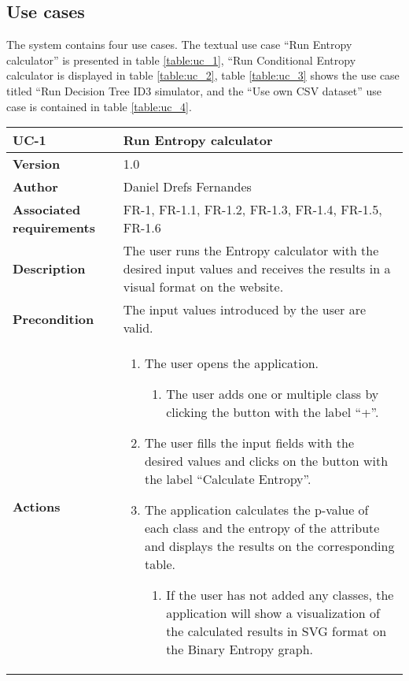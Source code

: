 \subsection{Use cases}
The system contains four use cases. The textual use case ``Run Entropy calculator'' is presented in table \ref{table:uc_1}, ``Run Conditional Entropy calculator is displayed in table \ref{table:uc_2}, table \ref{table:uc_3} shows the use case titled ``Run Decision Tree ID3 simulator, and the ``Use own CSV dataset'' use case is contained in table \ref{table:uc_4}.

\begin{table}[p]
	\centering
	\begin{tabularx}{\linewidth}{ p{} p{} }
		\toprule
		\textbf{UC-1}    & \textbf{Run Entropy calculator}\\
		\toprule
		\textbf{Version}              & 1.0    \\
		\textbf{Author}                & Daniel Drefs Fernandes \\
		\textbf{Associated requirements} & FR-1, FR-1.1, FR-1.2, FR-1.3, FR-1.4, FR-1.5, FR-1.6 \\
		\textbf{Description}          & The user runs the Entropy calculator with the desired input values and receives the results in a visual format on the website. \\
		\textbf{Precondition}         & The input values introduced by the user are valid. \\
		\textbf{Actions}             &
		\begin{enumerate}
			\def\labelenumi{\arabic{enumi}.}
			\tightlist
			\item The user opens the application.
            \begin{enumerate}
                \item The user adds one or multiple class by clicking the button with the label ``+''.
            \end{enumerate}
			\item The user fills the input fields with the desired values and clicks on the button with the label ``Calculate Entropy''.
            \item The application calculates the p-value of each class and the entropy of the attribute and displays the results on the corresponding table.
            \begin{enumerate}
                \item If the user has not added any classes, the application will show a visualization of the calculated results in SVG format on the Binary Entropy graph.

\end{enumerate}
\end{enumerate}
\end{tabularx}
\end{table}
